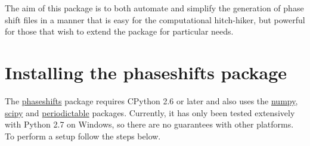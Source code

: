 \documentclass[letterpaper,10pt,english]{sphinxmanual}
\begin{document}
The aim of this package is to both automate and simplify the generation of
phase shift files in a manner that is easy for the computational hitch-hiker,
but powerful for those that wish to extend the package for particular needs.


\chapter{Installing the phaseshifts package}
\label{installing_phaseshifts:installing-phaseshifts}\label{installing_phaseshifts::doc}\label{installing_phaseshifts:installing-the-phaseshifts-package}
The \href{http://https://pypi.python.org/pypi/phaseshifts/}{phaseshifts} package
requires CPython 2.6 or later and also uses the \href{http://www.scipy.org/scipylib/download.html}{numpy}, \href{http://www.scipy.org/scipylib/download.html}{scipy} and \href{http://https://pypi.python.org/pypi/periodictable}{periodictable} packages.
Currently, it has only been tested extensively with Python 2.7 on Windows, so
there are no guarantees with other platforms. To perform a setup follow the
steps below.
\end{document}
